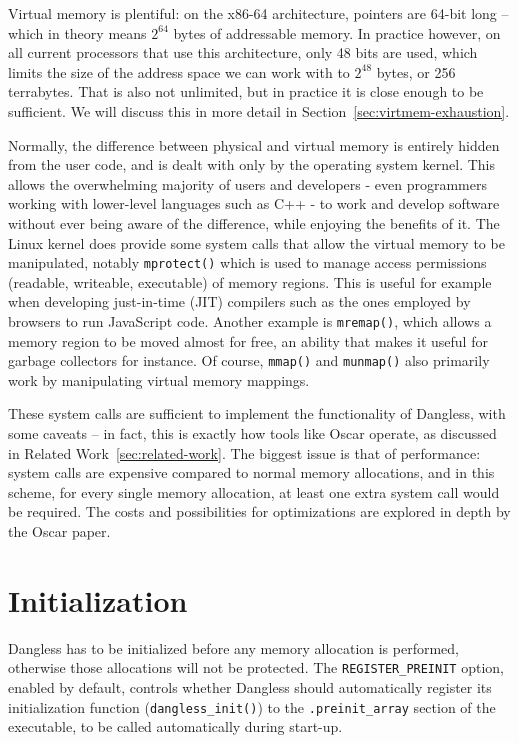 Virtual memory is plentiful: on the x86-64 architecture, pointers are 64-bit long -- which in theory means $2^{64}$ bytes of addressable memory. In practice however, on all current processors that use this architecture, only 48 bits are used, which limits the size of the address space we can work with to $2^{48}$ bytes, or 256 terrabytes. That is also not unlimited, but in practice it is close enough to be sufficient. We will discuss this in more detail in Section~\ref{sec:virtmem-exhaustion}.

Normally, the difference between physical and virtual memory is entirely hidden from the user code, and is dealt with only by the operating system kernel. This allows the overwhelming majority of users and developers - even programmers working with lower-level languages such as C++ - to work and develop software without ever being aware of the difference, while enjoying the benefits of it. The Linux kernel does provide some system calls that allow the virtual memory to be manipulated, notably \lstinline!mprotect()! which is used to manage access permissions (readable, writeable, executable) of memory regions. This is useful for example when developing just-in-time (JIT) compilers such as the ones employed by browsers to run JavaScript code. Another example is \lstinline!mremap()!, which allows a memory region to be moved almost for free, an ability that makes it useful for garbage collectors for instance. Of course,  \lstinline!mmap()! and \lstinline!munmap()! also primarily work by manipulating virtual memory mappings.

These system calls are sufficient to implement the functionality of Dangless, with some caveats -- in fact, this is exactly how tools like Oscar operate, as discussed in Related Work~\ref{sec:related-work}. The biggest issue is that of performance: system calls are expensive compared to normal memory allocations, and in this scheme, for every single memory allocation, at least one extra system call would be required. The costs and possibilities for optimizations are explored in depth by the Oscar paper.

\section{Initialization}
\label{sec:dangless-init}

Dangless has to be initialized before any memory allocation is performed, otherwise those allocations will not be protected. The \lstinline!REGISTER_PREINIT! option, enabled by default, controls whether Dangless should automatically register its initialization function (\lstinline!dangless_init()!) to the \lstinline!.preinit_array! section of the executable, to be called automatically during start-up.

